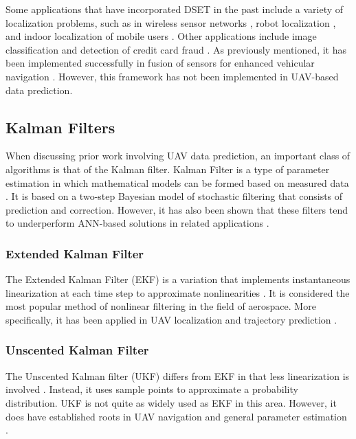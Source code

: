 \documentclass[12pt]{uthesis-v12}  %
\begin{document}
Some applications that have incorporated DSET in the past include a variety of localization problems, such as in wireless sensor networks \cite{elkin}, robot localization \cite{clarentin}, and indoor localization of mobile users \cite{kaseb}. 
Other applications include image classification \cite{rotten} and detection of credit card fraud \cite{panigrahi}.
As previously mentioned, it has been implemented successfully in fusion of sensors for enhanced vehicular navigation \cite{bhatt, aggarwal}. However, this framework has not been implemented in UAV-based data prediction.

\subsection{Kalman Filters}

When discussing prior work involving UAV data prediction, an important class of algorithms is that of the Kalman filter. Kalman Filter is a type of parameter estimation in which mathematical models can be formed based on measured data \cite{chow}. It is based on a two-step Bayesian model of stochastic filtering that consists of prediction and correction. However, it has also been shown that these filters tend to underperform ANN-based solutions in related applications \cite{aydo}.

\subsubsection{Extended Kalman Filter}

The Extended Kalman Filter (EKF) is a variation that implements instantaneous linearization at each time step to approximate nonlinearities \cite{chow}. It is considered the most popular method of nonlinear filtering in the field of aerospace. More specifically, it has been applied in UAV localization \cite{mao} and trajectory prediction \cite{prevost}.

\subsubsection{Unscented Kalman Filter}

The Unscented Kalman filter (UKF) differs from EKF in that less linearization is involved \cite{chow}. Instead, it uses sample points to approximate a probability distribution. UKF is not quite as widely used as EKF in this area. However, it does have established roots in UAV navigation \cite{oh} and general parameter estimation \cite{chow}.
\end{document}
